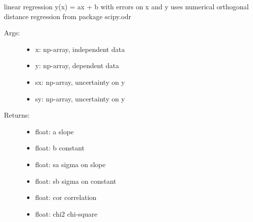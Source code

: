 \documentclass[letterpaper,10pt,english]{sphinxmanual}
\begin{document}
\begin{fulllineitems}
\label{\detokenize{index:PhyPraKit.PhyPraKit.linRegressionXY}}
linear regression y(x) = ax + b  with errors on x and y
uses numerical \sphinxquotedblleft{}orthogonal distance regression\sphinxquotedblright{} from package scipy.odr
\begin{description}
\item[{Args:}] \leavevmode\begin{itemize}
\item {} 
x:  np-array, independent data

\item {} 
y:  np-array, dependent data

\item {} 
sx: np-array, uncertainty on y

\item {} 
sy: np-array, uncertainty on y

\end{itemize}

\item[{Returns:}] \leavevmode\begin{itemize}
\item {} 
float: a     slope

\item {} 
float: b     constant

\item {} 
float: sa    sigma on slope

\item {} 
float: sb    sigma on constant

\item {} 
float: cor   correlation

\item {} 
float: chi2  chi-square

\end{itemize}

\end{description}

\end{fulllineitems}

\end{document}
